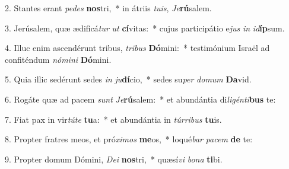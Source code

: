 2. Stantes erant \textit{pe}\textit{des} \textbf{nos}tri,~*  in átriis \textit{tu}\textit{is}, \textit{Je}\textbf{rú}salem.\

3. Jerúsalem, quæ ædificá\textit{tur} \textit{ut} \textbf{cí}vitas:~*  cujus participátio e\textit{jus} \textit{in} \textit{id}\textbf{íp}sum.\

4. Illuc enim ascendérunt tribus, \textit{tri}\textit{bus} \textbf{Dó}mini:~*  testimónium Israël ad confiténdum \textit{nó}\textit{mi}\textit{ni} \textbf{Dó}mini.\

5. Quia illic sedérunt sedes \textit{in} \textit{ju}\textbf{dí}cio,~*  sedes su\textit{per} \textit{do}\textit{mum} \textbf{Da}vid.\

6. Rogáte quæ ad pacem \textit{sunt} \textit{Je}\textbf{rú}salem:~*  et abundántia di\textit{li}\textit{gén}\textit{ti}\textbf{bus} te:\

7. Fiat pax in vir\textit{tú}\textit{te} \textbf{tu}a:~*  et abundántia in \textit{túr}\textit{ri}\textit{bus} \textbf{tu}is.\

8. Propter fratres meos, et pró\textit{xi}\textit{mos} \textbf{me}os,~*  loqué\textit{bar} \textit{pa}\textit{cem} \textbf{de} te:\

9. Propter domum Dómini, \textit{De}\textit{i} \textbf{nos}tri,~*  quæsí\textit{vi} \textit{bo}\textit{na} \textbf{ti}bi.\

